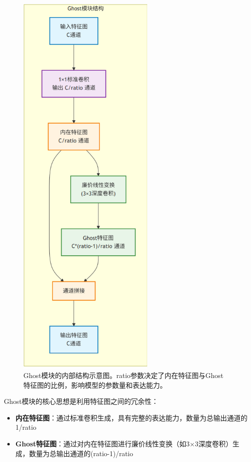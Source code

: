 \documentclass[a4paper]{article}
\begin{document}
\begin{figure}[H]
    \centering
    \includegraphics[width=0.6\textwidth]{fig/2.png}
    \caption{Ghost模块的内部结构示意图。ratio参数决定了内在特征图与Ghost特征图的比例，影响模型的参数量和表达能力。}
    \label{fig:ghost_ratio_impact}
\end{figure}

Ghost模块的核心思想是利用特征图之间的冗余性：
\begin{itemize}
    \item \textbf{内在特征图}：通过标准卷积生成，具有完整的表达能力，数量为总输出通道的1/ratio
    \item \textbf{Ghost特征图}：通过对内在特征图进行廉价线性变换（如3×3深度卷积）生成，数量为总输出通道的(ratio-1)/ratio
\end{itemize}
\end{document}
